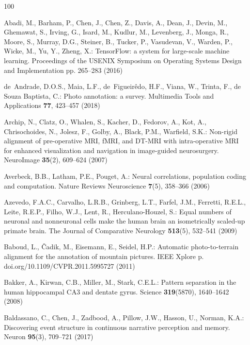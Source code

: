 \documentclass{llmxive}
\providecommand{\url}[1]{\texttt{#1}}
\providecommand{\urlprefix}{URL }
\providecommand{\doi}[1]{https://doi.org/#1}
\begin{document}
\begin{thebibliography}{100}
\providecommand{\url}[1]{\texttt{#1}}
\providecommand{\urlprefix}{URL }
\providecommand{\doi}[1]{https://doi.org/#1}

Abadi, M., Barham, P., Chen, J., Chen, Z., Davis, A., Dean, J., Devin, M.,
  Ghemawat, S., Irving, G., Isard, M., Kudlur, M., Levenberg, J., Monga, R.,
  Moore, S., Murray, D.G., Steiner, B., Tucker, P., Vasudevan, V., Warden, P.,
  Wicke, M., Yu, Y., Zheng, X.: {TensorFlow}: a system for large-scale machine
  learning. Proceedings of the {USENIX} Symposium on Operating Systems Design
  and Implementation pp. 265--283 (2016)

de~Andrade, D.O.S., Maia, L.F., de~Figueir{\^e}do, H.F., Viana, W., Trinta, F.,
  {de Souza Baptista}, C.: Photo annotation: a survey. Multimedia Tools and
  Applications  \textbf{77},  423--457 (2018)

Archip, N., Clatz, O., Whalen, S., Kacher, D., Fedorov, A., Kot, A.,
  Chrisochoides, N., Jolesz, F., Golby, A., Black, P.M., Warfield, S.K.:
  Non-rigid alignment of pre-operative {MRI}, {fMRI}, and {DT-MRI} with
  intra-operative {MRI} for enhanced visualization and navigation in
  image-guided neurosurgery. {NeuroImage}  \textbf{35}(2),  609--624 (2007)

Averbeck, B.B., Latham, P.E., Pouget, A.: Neural correlations, population
  coding and computation. Nature Reviews Neuroscience  \textbf{7}(5),  358--366
  (2006)

Azevedo, F.A.C., Carvalho, L.R.B., Grinberg, L.T., Farfel, J.M., Ferretti,
  R.E.L., Leite, R.E.P., Filho, W.J., Lent, R., Herculano-Houzel, S.: Equal
  numbers of neuronal and nonneuronal cells make the human brain an
  isometrically scaled-up primate brain. The Journal of Comparative Neurology
  \textbf{513}(5),  532--541 (2009)

Baboud, L., {\v C}adik, M., Eisemann, E., Seidel, H.P.: Automatic
  photo-to-terrain alignment for the annotation of mountain pictures. {IEEE}
  {Xplore} p. doi.org/10.1109/CVPR.2011.5995727 (2011)

Bakker, A., Kirwan, C.B., Miller, M., Stark, C.E.L.: Pattern separation in the
  human hippocampal {CA3} and dentate gyrus. Science  \textbf{319}(5870),
  1640--1642 (2008)

Baldassano, C., Chen, J., Zadbood, A., Pillow, J.W., Hasson, U., Norman, K.A.:
  Discovering event structure in continuous narrative perception and memory.
  Neuron  \textbf{95}(3),  709--721 (2017)


\end{thebibliography}
\end{document}
